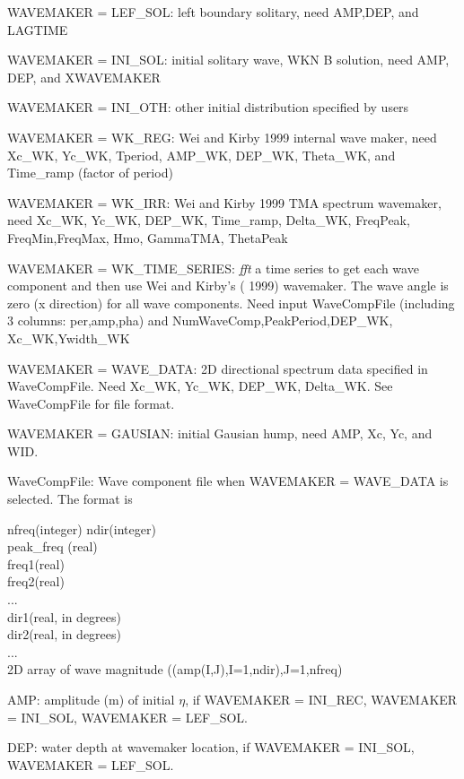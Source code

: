 \documentclass[11pt]{article}
\begin{document}
\begin{description}
WAVEMAKER = LEF\_SOL: left boundary solitary, need AMP,DEP, and LAGTIME

WAVEMAKER = INI\_SOL: initial solitary wave, WKN B solution, need AMP, DEP, and XWAVEMAKER 

WAVEMAKER = INI\_OTH:  other initial distribution specified by users

WAVEMAKER = WK\_REG: Wei and Kirby 1999 internal wave maker, need Xc\_WK, Yc\_WK, Tperiod, AMP\_WK, DEP\_WK, Theta\_WK, and Time\_ramp (factor of period)

WAVEMAKER = WK\_IRR:  Wei and Kirby 1999 TMA spectrum wavemaker, need Xc\_WK, Yc\_WK,
           DEP\_WK, Time\_ramp, Delta\_WK,  FreqPeak, FreqMin,FreqMax,
            Hmo, GammaTMA, ThetaPeak

WAVEMAKER = WK\_TIME\_SERIES: {\em fft} a time series to get each wave component
                 and then use Wei and Kirby's ( 1999) wavemaker.  The wave angle is zero (x direction) for all wave components.
           Need input WaveCompFile (including 3 columns: per,amp,pha) and 
            NumWaveComp,PeakPeriod,DEP\_WK, Xc\_WK,Ywidth\_WK
 
WAVEMAKER = WAVE\_DATA:  2D directional spectrum data specified in WaveCompFile. Need Xc\_WK, Yc\_WK,
           DEP\_WK, Delta\_WK. See WaveCompFile for file format. 
            
WAVEMAKER = GAUSIAN: initial Gausian hump, need AMP, Xc, Yc, and WID.          

\item WaveCompFile: Wave component file when    WAVEMAKER = WAVE\_DATA is selected.  The format is

nfreq(integer) ndir(integer) \\
peak\_freq (real) \\
freq1(real) \\
freq2(real) \\
... \\
dir1(real, in degrees) \\
dir2(real, in degrees) \\
... \\
2D array of wave magnitude ((amp(I,J),I=1,ndir),J=1,nfreq)



\item AMP: amplitude (m) of initial $\eta$, if  WAVEMAKER = INI\_REC, WAVEMAKER = INI\_SOL, WAVEMAKER = LEF\_SOL.

\item DEP: water depth at wavemaker location, if WAVEMAKER = INI\_SOL, WAVEMAKER = LEF\_SOL.


\end{description}
\end{document}
